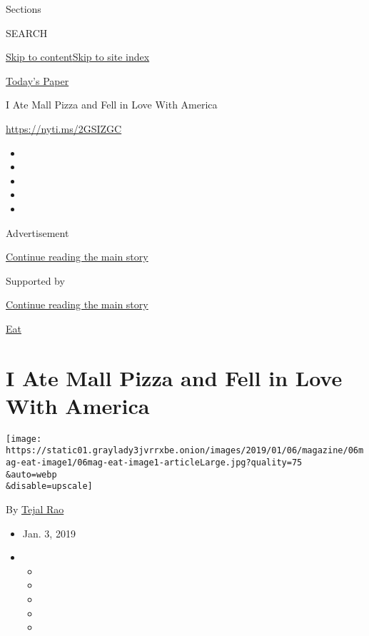 Sections

SEARCH

\protect\hyperlink{site-content}{Skip to
content}\protect\hyperlink{site-index}{Skip to site index}

\href{https://myaccount.nytimes3xbfgragh.onion/auth/login?response_type=cookie\&client_id=vi}{}

\href{https://www.nytimes3xbfgragh.onion/section/todayspaper}{Today's
Paper}

I Ate Mall Pizza and Fell in Love With America

\url{https://nyti.ms/2GSIZGC}

\begin{itemize}
\item
\item
\item
\item
\item
\end{itemize}

Advertisement

\protect\hyperlink{after-top}{Continue reading the main story}

Supported by

\protect\hyperlink{after-sponsor}{Continue reading the main story}

\href{/column/magazine-eat}{Eat}

\hypertarget{i-ate-mall-pizza-and-fell-in-love-with-america}{%
\section{I Ate Mall Pizza and Fell in Love With
America}\label{i-ate-mall-pizza-and-fell-in-love-with-america}}

\texttt{[image: https://static01.graylady3jvrrxbe.onion/images/2019/01/06/magazine/06mag-eat-image1/06mag-eat-image1-articleLarge.jpg?quality=75\\\&auto=webp\\\&disable=upscale]}

By \href{https://www.nytimes3xbfgragh.onion/by/tejal-rao}{Tejal Rao}

\begin{itemize}
\item
  Jan. 3, 2019
\item
  \begin{itemize}
  \item
  \item
  \item
  \item
  \item
  \end{itemize}
\end{itemize}


